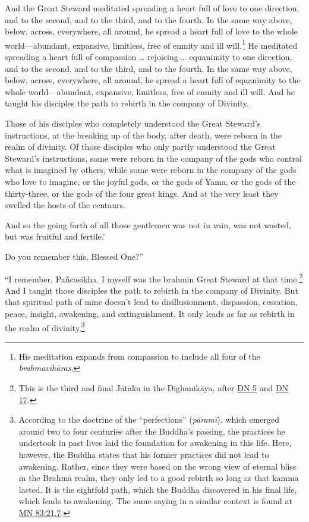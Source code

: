 \documentclass[12pt,openany]{book}%
\begin{document}
And the Great Steward meditated spreading a heart full of love to one direction, and to the second, and to the third, and to the fourth. In the same way above, below, across, everywhere, all around, he spread a heart full of love to the whole world—abundant, expansive, limitless, free of enmity and ill will.\footnote{His meditation expands from compassion to include all four of the \textit{\textsanskrit{brahmavihāras}}. } He meditated spreading a heart full of compassion … rejoicing … equanimity to one direction, and to the second, and to the third, and to the fourth. In the same way above, below, across, everywhere, all around, he spread a heart full of equanimity to the whole world—abundant, expansive, limitless, free of enmity and ill will. And he taught his disciples the path to rebirth in the company of Divinity. 

Those of his disciples who completely understood the Great Steward’s instructions, at the breaking up of the body, after death, were reborn in the realm of divinity. Of those disciples who only partly understood the Great Steward’s instructions, some were reborn in the company of the gods who control what is imagined by others, while some were reborn in the company of the gods who love to imagine, or the joyful gods, or the gods of Yama, or the gods of the thirty-three, or the gods of the four great kings. And at the very least they swelled the hosts of the centaurs. 

And so the going forth of all those gentlemen was not in vain, was not wasted, but was fruitful and fertile.’ 

Do you remember this, Blessed One?” 

“I remember, \textsanskrit{Pañcasikha}. I myself was the brahmin Great Steward at that time.\footnote{This is the third and final \textsanskrit{Jātaka} in the \textsanskrit{Dīghanikāya}, after \href{https://suttacentral.net/dn5/en/sujato}{DN 5} and \href{https://suttacentral.net/dn17/en/sujato}{DN 17}. } And I taught those disciples the path to rebirth in the company of Divinity. But that spiritual path of mine doesn’t lead to disillusionment, dispassion, cessation, peace, insight, awakening, and extinguishment. It only leads as far as rebirth in the realm of divinity.\footnote{According to the doctrine of the “perfections” (\textit{\textsanskrit{pāramī}}), which emerged around two to four centuries after the Buddha’s passing, the practices he undertook in past lives laid the foundation for awakening in this life. Here, however, the Buddha states that his former practices did not lead to awakening. Rather, since they were based on the wrong view of eternal bliss in the \textsanskrit{Brahmā} realm, they only led to a good rebirth so long as that kamma lasted. It is the eightfold path, which the Buddha discovered in his final life, which leads to awakening. The same saying in a similar context is found at \href{https://suttacentral.net/mn83/en/sujato\#21.7}{MN 83:21.7}. } 
\end{document}
